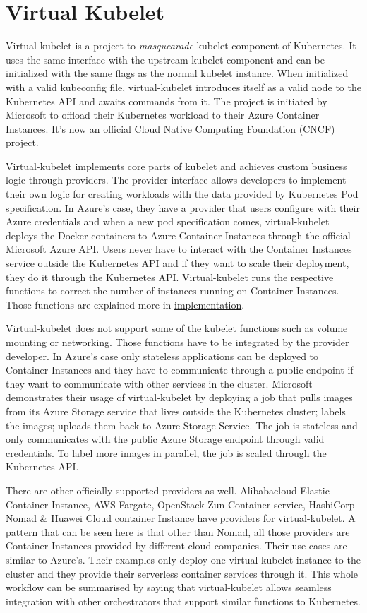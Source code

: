 \section*{Virtual Kubelet}
Virtual-kubelet \cite{virtual} is a project to \textit{masquearade} kubelet component of Kubernetes. It uses the same interface with the upstream kubelet component and can be initialized with the same flags as the normal kubelet instance. When initialized with a valid kubeconfig file, virtual-kubelet introduces itself as a valid node to the Kubernetes API and awaits commands from it. The project is initiated by Microsoft to offload their Kubernetes workload to their Azure Container Instances. It's now an official Cloud Native Computing Foundation (CNCF) project.

Virtual-kubelet implements core parts of kubelet and achieves custom business logic through providers. The provider interface allows developers to implement their own logic for creating workloads with the data provided by Kubernetes Pod specification. In Azure's case, they have a provider that users configure with their Azure credentials and when a new pod specification comes, virtual-kubelet deploys the Docker containers to Azure Container Instances through the official Microsoft Azure API. Users never have to interact with the Container Instances service outside the Kubernetes API and if they want to scale their deployment, they do it through the Kubernetes API. Virtual-kubelet runs the respective functions to correct the number of instances running on Container Instances. Those functions are explained more in \hyperref[chapter:implementation]{implementation}.

Virtual-kubelet does not support some of the kubelet functions such as volume mounting or networking. Those functions have to be integrated by the provider developer. In Azure's case only stateless applications can be deployed to Container Instances and they have to communicate through a public endpoint if they want to communicate with other services in the cluster. Microsoft demonstrates their usage of virtual-kubelet by deploying a job that pulls images from its Azure Storage service that lives outside the Kubernetes cluster; labels the images; uploads them back to Azure Storage Service. The job is stateless and only communicates with the public Azure Storage endpoint through valid credentials. To label more images in parallel, the job is scaled through the Kubernetes API.

There are other officially supported providers as well. Alibabacloud Elastic Container Instance, AWS Fargate, OpenStack Zun Container service, HashiCorp Nomad \& Huawei Cloud container Instance have providers for virtual-kubelet. A pattern that can be seen here is that other than Nomad, all those providers are Container Instances provided by different cloud companies. Their use-cases are similar to Azure's. Their examples only deploy one virtual-kubelet instance to the cluster and they provide their serverless container services through it. This whole workflow can be summarised by saying that virtual-kubelet allows seamless integration with other orchestrators that support similar functions to Kubernetes.

